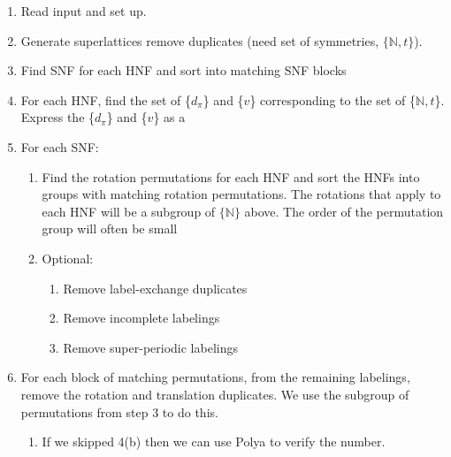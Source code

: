 \documentclass{article}
\begin{document}
\begin{enumerate}
\item Read input and set up.
\item Generate superlattices remove duplicates (need set of symmetries, $\{\mathbb{N},t\}$). 
\item Find SNF for each HNF and sort into matching SNF blocks
\item For each HNF, find the set of \{$d_{\pi}$\} and \{$v$\} corresponding to the set of
  \{$\mathbb{N},t$\}. Express the \{$d_{\pi}$\} and \{$v$\} as a 
\item For each SNF:
  \begin{enumerate}
  \item Find the rotation permutations for each HNF and sort the HNFs into groups with matching
    rotation permutations. The rotations that apply to each HNF will be a subgroup of
    $\{\mathbb{N}\}$ above. The order of the permutation group will often be small
  \item Optional:
    \begin{enumerate}
    \item Remove label-exchange duplicates
    \item Remove incomplete labelings
    \item Remove super-periodic labelings
    \end{enumerate}
  \end{enumerate}
\item For each block of matching permutations, from the remaining labelings, remove the rotation and
  translation duplicates. We use the subgroup of permutations from step 3 to do this.
\begin{enumerate}
\item If we skipped 4(b) then we can use Polya to verify the number.
\end{enumerate}

\end{enumerate}
\end{document}
